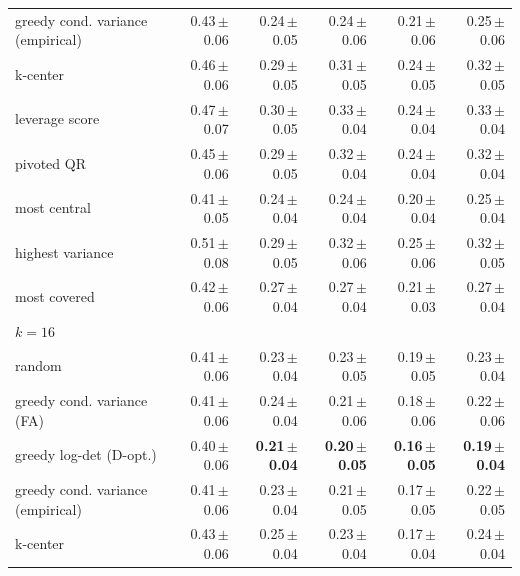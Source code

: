 \begin{tabular}{lrrrrr}
greedy cond. variance (empirical) & 0.43\,{\scriptsize$\pm$0.06} & 0.24\,{\scriptsize$\pm$0.05} & 0.24\,{\scriptsize$\pm$0.06} & 0.21\,{\scriptsize$\pm$0.06} & 0.25\,{\scriptsize$\pm$0.06} \\
k-center & 0.46\,{\scriptsize$\pm$0.06} & 0.29\,{\scriptsize$\pm$0.05} & 0.31\,{\scriptsize$\pm$0.05} & 0.24\,{\scriptsize$\pm$0.05} & 0.32\,{\scriptsize$\pm$0.05} \\
leverage score & 0.47\,{\scriptsize$\pm$0.07} & 0.30\,{\scriptsize$\pm$0.05} & 0.33\,{\scriptsize$\pm$0.04} & 0.24\,{\scriptsize$\pm$0.04} & 0.33\,{\scriptsize$\pm$0.04} \\
pivoted QR & 0.45\,{\scriptsize$\pm$0.06} & 0.29\,{\scriptsize$\pm$0.05} & 0.32\,{\scriptsize$\pm$0.04} & 0.24\,{\scriptsize$\pm$0.04} & 0.32\,{\scriptsize$\pm$0.04} \\
most central & 0.41\,{\scriptsize$\pm$0.05} & 0.24\,{\scriptsize$\pm$0.04} & 0.24\,{\scriptsize$\pm$0.04} & 0.20\,{\scriptsize$\pm$0.04} & 0.25\,{\scriptsize$\pm$0.04} \\
highest variance & 0.51\,{\scriptsize$\pm$0.08} & 0.29\,{\scriptsize$\pm$0.05} & 0.32\,{\scriptsize$\pm$0.06} & 0.25\,{\scriptsize$\pm$0.06} & 0.32\,{\scriptsize$\pm$0.05} \\
most covered & 0.42\,{\scriptsize$\pm$0.06} & 0.27\,{\scriptsize$\pm$0.04} & 0.27\,{\scriptsize$\pm$0.04} & 0.21\,{\scriptsize$\pm$0.03} & 0.27\,{\scriptsize$\pm$0.04} \\
\multicolumn{6}{l}{\emph{$k=16$}} \\
random & 0.41\,{\scriptsize$\pm$0.06} & 0.23\,{\scriptsize$\pm$0.04} & 0.23\,{\scriptsize$\pm$0.05} & 0.19\,{\scriptsize$\pm$0.05} & 0.23\,{\scriptsize$\pm$0.04} \\
greedy cond. variance (FA) & 0.41\,{\scriptsize$\pm$0.06} & 0.24\,{\scriptsize$\pm$0.04} & 0.21\,{\scriptsize$\pm$0.06} & 0.18\,{\scriptsize$\pm$0.06} & 0.22\,{\scriptsize$\pm$0.06} \\
greedy log-det (D-opt.) & 0.40\,{\scriptsize$\pm$0.06} & \textbf{0.21\,{\scriptsize$\pm$0.04}} & \textbf{0.20\,{\scriptsize$\pm$0.05}} & \textbf{0.16\,{\scriptsize$\pm$0.05}} & \textbf{0.19\,{\scriptsize$\pm$0.04}} \\
greedy cond. variance (empirical) & 0.41\,{\scriptsize$\pm$0.06} & 0.23\,{\scriptsize$\pm$0.04} & 0.21\,{\scriptsize$\pm$0.05} & 0.17\,{\scriptsize$\pm$0.05} & 0.22\,{\scriptsize$\pm$0.05} \\
k-center & 0.43\,{\scriptsize$\pm$0.06} & 0.25\,{\scriptsize$\pm$0.04} & 0.23\,{\scriptsize$\pm$0.04} & 0.17\,{\scriptsize$\pm$0.04} & 0.24\,{\scriptsize$\pm$0.04} \\

\end{tabular}
